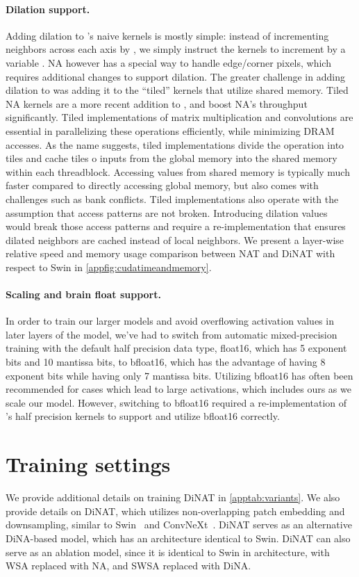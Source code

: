 \paragraph{Dilation support.} Adding dilation to \natten{}'s naive kernels is mostly simple: instead of incrementing neighbors across each axis by , we simply instruct the kernels to increment by a variable . NA however has a special way to handle edge/corner pixels, which requires additional changes to support dilation.
The greater challenge in adding dilation to \natten{} was adding it to the ``tiled'' kernels that utilize shared memory.
Tiled NA kernels are a more recent addition to \natten{}, and boost NA's throughput significantly. 
Tiled implementations of matrix multiplication and convolutions are essential in parallelizing these operations efficiently, while minimizing DRAM accesses.
As the name suggests, tiled implementations divide the operation into tiles and cache tiles o inputs from the global memory into the shared memory within each threadblock.
Accessing values from shared memory is typically much faster compared to directly accessing global memory, but also comes with challenges such as bank conflicts.
Tiled implementations also operate with the assumption that access patterns are not broken.
Introducing dilation values would break those access patterns and require a re-implementation that ensures dilated neighbors are cached instead of local neighbors.
We present a layer-wise relative speed and memory usage comparison between NAT and DiNAT with respect to Swin in \cref{appfig:cudatimeandmemory}.

\paragraph{Scaling and brain float support.} In order to train our larger models and avoid overflowing activation values in later layers of the model, we've had to switch from automatic mixed-precision training with the default half precision data type, float16, which has 5 exponent bits and 10 mantissa bits, to bfloat16, which has the advantage of having 8 exponent bits while having only 7 mantissa bits. Utilizing bfloat16 has often been recommended for cases which lead to large activations, which includes ours as we scale our model. However, switching to bfloat16 required a re-implementation of \natten{}'s half precision kernels to support and utilize bfloat16 correctly.

\section{Training settings}
\label{appsec:hyperparameters}
We provide additional details on training DiNAT in \cref{apptab:variants}.
We also provide details on DiNAT, which utilizes non-overlapping patch embedding and downsampling, similar to Swin~\cite{liu2021swin} and ConvNeXt~\cite{liu2022convnet}.
DiNAT serves as an alternative DiNA-based model, which has an architecture identical to Swin.
DiNAT can also serve as an ablation model, since it is identical to Swin in architecture, with WSA replaced with NA, and SWSA replaced with DiNA.

